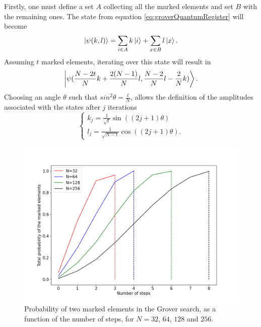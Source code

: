 \documentclass[../../dissertation.tex]{subfiles}
\begin{document}
Firstly, one must define a set $A$ collecting all the marked elements
and set $B$ with the remaining ones. The state from equation
\eqref{eq:groverQuantumRegister} will become
\begin{equation}
	\ket{\psi(k,l)} =\sum_{i\in A} k\ket{i} + \sum_{x \in B}l\ket{x}.
\end{equation}
Assuming $t$ marked elements, iterating over this state will result in
\begin{equation}
	\ket{\psi(\frac{N-2t}{N}k + \frac{2(N-1)}{N}l, \frac{N-2}{N}l - \frac{2}{N}k)}.
\end{equation}
Choosing an angle $\theta$ such that $sin^2\theta=\frac{t}{N}$, allows the
definition of the amplitudes associated with the states after $j$ iterations 
\begin{equation}
	\begin{cases}
		k_{j} =\frac{1}{\sqrt{t}} \sin{((2j+1)\theta)} 
		\\l_{j} = \frac{1}{\sqrt{N-t}}\cos{((2j+1)\theta)}.
	\end{cases}\label{eq:groverKandJ2}
\end{equation}
\begin{figure}[h]
	\centering
	\includegraphics[scale=0.40]{img/Grover/GroverMultipleMarked3264128256}
	\caption{Probability of two marked elements in the Grover search, as a function of the number of steps, for $N=32$, $64$, $128$ and $256$.} 
	\label{fig:groverMultipleMarked3264128256}
\end{figure}
\end{document}
